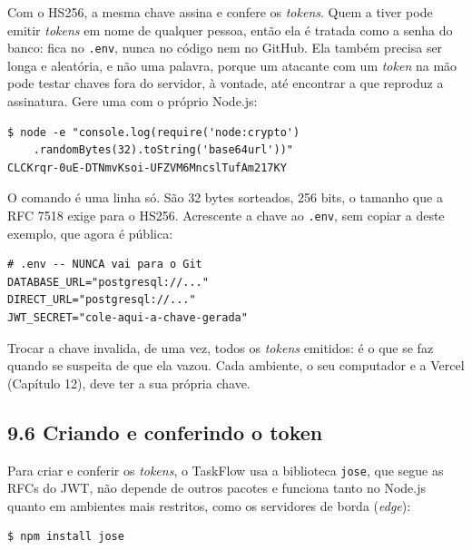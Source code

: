 Com o HS256, a mesma chave assina e confere os \textit{tokens}. Quem a tiver pode emitir \textit{tokens} em nome de qualquer pessoa, então ela é tratada como a senha do banco: fica no \texttt{.env}, nunca no código nem no GitHub. Ela também precisa ser longa e aleatória, e não uma palavra, porque um atacante com um \textit{token} na mão pode testar chaves fora do servidor, à vontade, até encontrar a que reproduz a assinatura. Gere uma com o próprio Node.js:

\begin{codigo}
\begin{Verbatim}[breaklines=true, breaksymbolleft={}, fontsize=\footnotesize]
$ node -e "console.log(require('node:crypto')
    .randomBytes(32).toString('base64url'))"
CLCKrqr-0uE-DTNmvKsoi-UFZVM6MncslTufAm217KY
\end{Verbatim}
\end{codigo}

O comando é uma linha só. São 32 bytes sorteados, 256 bits, o tamanho que a RFC 7518 exige para o HS256. Acrescente a chave ao \texttt{.env}, sem copiar a deste exemplo, que agora é pública:

\begin{codigo}
\begin{Verbatim}[breaklines=true, breaksymbolleft={}, fontsize=\footnotesize]
# .env -- NUNCA vai para o Git
DATABASE_URL="postgresql://..."
DIRECT_URL="postgresql://..."
JWT_SECRET="cole-aqui-a-chave-gerada"
\end{Verbatim}
\end{codigo}

Trocar a chave invalida, de uma vez, todos os \textit{tokens} emitidos: é o que se faz quando se suspeita de que ela vazou. Cada ambiente, o seu computador e a Vercel (Capítulo 12), deve ter a sua própria chave.

\subsection{9.6 Criando e conferindo o token}

Para criar e conferir os \textit{tokens}, o TaskFlow usa a biblioteca \texttt{jose}, que segue as RFCs do JWT, não depende de outros pacotes e funciona tanto no Node.js quanto em ambientes mais restritos, como os servidores de borda (\textit{edge}):

\begin{codigo}
\begin{Verbatim}[breaklines=true, breaksymbolleft={}, fontsize=\footnotesize]
$ npm install jose
\end{Verbatim}
\end{codigo}

